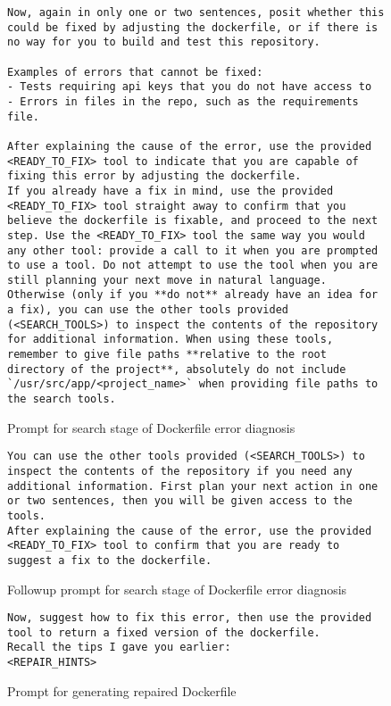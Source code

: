 \documentclass[conference]{IEEEtran}
\begin{document}
\begin{figure}[h!]
    \begin{lstlisting}
Now, again in only one or two sentences, posit whether this could be fixed by adjusting the dockerfile, or if there is no way for you to build and test this repository.

Examples of errors that cannot be fixed:
- Tests requiring api keys that you do not have access to
- Errors in files in the repo, such as the requirements file.

After explaining the cause of the error, use the provided <READY_TO_FIX> tool to indicate that you are capable of fixing this error by adjusting the dockerfile.
If you already have a fix in mind, use the provided <READY_TO_FIX> tool straight away to confirm that you believe the dockerfile is fixable, and proceed to the next step. Use the <READY_TO_FIX> tool the same way you would any other tool: provide a call to it when you are prompted to use a tool. Do not attempt to use the tool when you are still planning your next move in natural language.
Otherwise (only if you **do not** already have an idea for a fix), you can use the other tools provided (<SEARCH_TOOLS>) to inspect the contents of the repository for additional information. When using these tools, remember to give file paths **relative to the root directory of the project**, absolutely do not include `/usr/src/app/<project_name>` when providing file paths to the search tools.
    \end{lstlisting}
    \caption{Prompt for search stage of Dockerfile error diagnosis}
\end{figure}
\begin{figure}[h!]
    \begin{lstlisting}
You can use the other tools provided (<SEARCH_TOOLS>) to inspect the contents of the repository if you need any additional information. First plan your next action in one or two sentences, then you will be given access to the tools.
After explaining the cause of the error, use the provided <READY_TO_FIX> tool to confirm that you are ready to suggest a fix to the dockerfile.
    \end{lstlisting}
    \caption{Followup prompt for search stage of Dockerfile error diagnosis}
\end{figure}
\begin{figure}[h!]
    \begin{lstlisting}
Now, suggest how to fix this error, then use the provided tool to return a fixed version of the dockerfile.
Recall the tips I gave you earlier:
<REPAIR_HINTS>
    \end{lstlisting}
    \caption{Prompt for generating repaired Dockerfile}
\end{figure}
\end{document}
